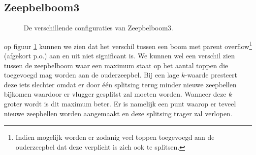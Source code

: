 \documentclass[12pt,hidelinks]{article}
\begin{document}
    \subsection{Zeepbelboom3}
    \begin{figure}[H]
        \caption{De verschillende configuraties van Zeepbelboom3.}
        \label{figZB3}
    \end{figure}
    op figuur \ref{figZB3} kunnen we zien dat het verschil tussen een boom met parent overflow\footnote{Indien mogelijk worden er zodanig veel toppen toegevoegd aan de ouderzeepbel dat deze verplicht is zich ook te splitsen.} (afgekort p.o.) aan en uit niet significant is. We kunnen wel een verschil zien tussen de zeepbelboom waar een maximum staat op het aantal toppen
    die toegevoegd mag worden aan de ouderzeepbel.
    Bij een lage $k$-waarde presteert deze iets slechter omdat er door één splitsing terug minder nieuwe zeepbellen bijkomen waardoor er vlugger gesplitst zal moeten worden.
     Wanneer deze $k$ groter wordt is dit maximum beter. Er is namelijk een punt waarop er teveel nieuwe zeepbellen worden aangemaakt en deze splitsing trager zal verlopen.
\end{document}
